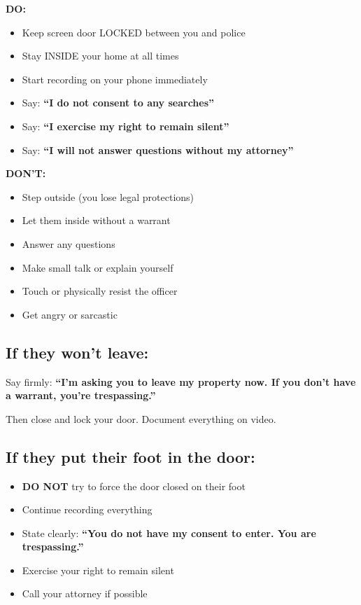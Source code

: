 \documentclass[10pt,letterpaper,twocolumn]{article}
\begin{document}
\textbf{DO:}
\begin{itemize}[leftmargin=*]
    \item Keep screen door LOCKED between you and police
    \item Stay INSIDE your home at all times
    \item Start recording on your phone immediately
    \item Say: \textbf{``I do not consent to any searches''}
    \item Say: \textbf{``I exercise my right to remain silent''}
    \item Say: \textbf{``I will not answer questions without my attorney''}
\end{itemize}

\noindent\textbf{DON'T:}
\begin{itemize}[leftmargin=*]
    \item Step outside (you lose legal protections)
    \item Let them inside without a warrant
    \item Answer any questions
    \item Make small talk or explain yourself
    \item Touch or physically resist the officer
    \item Get angry or sarcastic
\end{itemize}

\subsection{If they won't leave:}

Say firmly: \textbf{``I'm asking you to leave my property now. If you don't have a warrant, you're trespassing.''}

\noindent Then close and lock your door. Document everything on video.

\subsection{If they put their foot in the door:}

\begin{itemize}[leftmargin=*]
    \item \textbf{DO NOT} try to force the door closed on their foot
    \item Continue recording everything
    \item State clearly: \textbf{``You do not have my consent to enter. You are trespassing.''}
    \item Exercise your right to remain silent
    \item Call your attorney if possible
\end{itemize}
\end{document}
